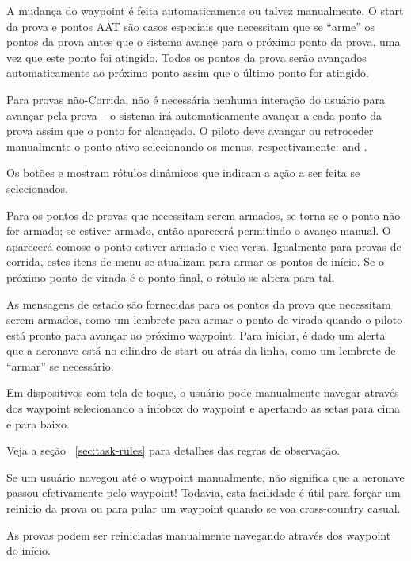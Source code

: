 A mudança do waypoint é feita automaticamente ou talvez manualmente.  O start da prova e pontos AAT são casos especiais que necessitam que se “arme” os pontos da prova antes que o sistema avançe para o próximo ponto da prova, uma vez que este ponto foi atingido.  Todos os pontos da prova serão avançados automaticamente ao próximo ponto assim que o último ponto for atingido.

Para provas não-Corrida, não é necessária nenhuma interação do usuário para avançar pela prova – o sistema irá automaticamente avançar a cada ponto da prova assim que o ponto for alcançado.  O piloto deve avançar ou retroceder manualmente o ponto ativo selecionando os menus, respectivamente:
 \blink{} and
\blink{}.

Os botões  e
 mostram rótulos dinâmicos que indicam a ação a ser feita se selecionados.

Para os pontos de provas que necessitam serem armados,  se torna 
 se o ponto não for armado;  se estiver armado, então aparecerá
 permitindo o avanço manual.  O
 aparecerá comose o ponto estiver armado e vice versa.  Igualmente para provas de corrida, estes itens de menu se atualizam para armar os pontos de início.  Se o próximo ponto de virada é o ponto final, o rótulo se altera para tal.

As mensagens de estado são fornecidas para os pontos da prova que necessitam serem armados, como um lembrete para armar o ponto de virada quando o piloto está pronto para avançar ao próximo waypoint.  Para iniciar, é dado um alerta que a aeronave está no cilindro de start ou atrás da linha, como um lembrete de “armar” se necessário.  

Em dispositivos com tela de toque, o usuário pode manualmente navegar através dos waypoint selecionando a infobox do waypoint e apertando as setas para cima e para baixo.

Veja a seção ~\ref{sec:task-rules} para detalhes das regras de observação.

Se um usuário navegou até o waypoint manualmente, não significa que a aeronave passou efetivamente pelo waypoint!  Todavia, esta facilidade é útil para forçar um reinicio da prova ou para pular um waypoint quando se voa cross-country casual.

\tip As provas podem ser reiniciadas manualmente navegando através dos waypoint do início.

